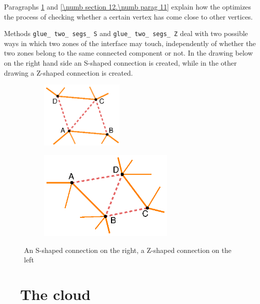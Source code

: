 Paragraphs \ref{\numb section 12.\numb parag 10} and \ref{\numb section 12.\numb parag 11}
explain how the {\small\tt{}} optimizes the process of checking whether a
certain vertex has come close to other vertices.

Methods {\small\tt glue\_\,two\_\,segs\_\,S} and
{\small\tt glue\_\,two\_\,segs\_\,Z} deal with two possible ways in which two
zones of the interface may touch,
independently of whether the two zones belong to the same connected component or not.
In the drawing below on the right hand side an S-shaped connection is created,
while in the other drawing a Z-shaped connection is created.

\begin{figure}[ht] \centering
\begin{subfigure}{45mm}\centering
  \includegraphics[width=40mm]{connect-S}
\end{subfigure}  
\begin{subfigure}{70mm}\centering
  \includegraphics[width=65mm]{connect-Z}
\end{subfigure}  
  \caption{An S-shaped connection on the right, a Z-shaped connection on the left}
  \label{\numb section 12.\numb fig 8}
\end{figure}


\section{~~The cloud}\label{\numb section 12.\numb parag 10}

